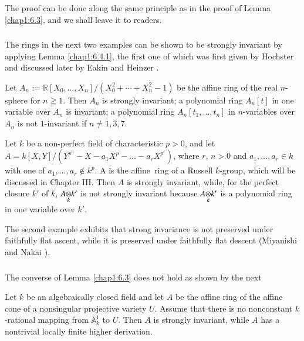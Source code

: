 The proof can be done along the same principle as in the proof of
Lemma \ref{chap1:6.3}, and we shall leave it to readers.


\subsubsection{}\label{chap1:6.4.2}
The rings in the next two examples can be shown to be strongly
invariant by applying Lemma \ref{chap1:6.4.1}, the first one of which was
first given by Hochster \cite{23} and discussed later by Eakin and
Heinzer \cite{13}.

\begin{example*}[1 ]
Let
$A_{n}:=\mathbb{R}[X_{0},\ldots,X_{n}]/(X^{2}_{0}+\cdots+X^{2}_{n}-1)$
be the affine ring of the real $n$-sphere for $n\geqq 1$. Then $A_{n}$
is strongly invariant; a polynomial ring $A_{n}[t]$ in one variable
over $A_{n}$ is invariant; a polynomial ring
$A_{n}[t_{1},\ldots,t_{n}]$ in $n$-variables over $A_{n}$ is not
$1$-invariant if $n\neq 1,3,7$.
\end{example*}

\begin{example*}[2 ]
Let $k$ be a non-perfect field of characteristic $p>0$, and let
$A=k[X,Y]/(Y^{p^{n}}-X-a_{1}X^{p}-\ldots-a_{r}X^{p^{r}})$, where $r$,
$n>0$ and $a_{1},\ldots,a_{r}\in k$ with one of
$a_{1},\ldots,a_{r}\not\in k^{p}$. A is the affine\pageoriginale\ ring
of a Russell $k$-group, which will be discussed in Chapter III. Then
$A$ is strongly invariant, while, for the perfect closure $k'$ of $k$,
$\foprod{A}{k'}{k}$ is not strongly invariant because
$\foprod{A}{k'}{k}$ is a polynomial ring in one variable over $k'$.

The second example exhibits that strong invariance is not preserved
under faithfully flat ascent, while it is preserved under faithfully
flat descent (\cf Miyanishi and Nakai \cite{36}).
\end{example*}

\subsubsection{}\label{chap1:6.4.3}
The converse of Lemma \ref{chap1:6.3} does not hold as shown by the next 

\begin{example*}
Let $k$ be an algebraically closed field and let $A$ be the affine
ring of the affine cone of a nonsingular projective variety
$U$. Assume that there is no nonconstant $k$-rational mapping from
$\mathbb{A}^{1}_{k}$ to $U$. Then $A$ is strongly invariant, while $A$
has a nontrivial locally finite higher derivation.
\end{example*}

